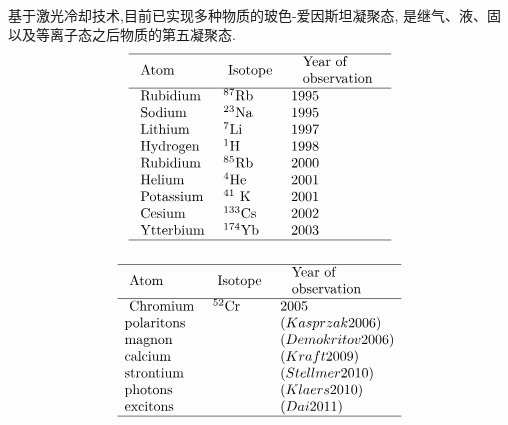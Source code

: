    
    \begin{frame} 
    \frametitle{}
    ~\\
    基于激光冷却技术,目前已实现多种物质的玻色-爱因斯坦凝聚态, 是继气、液、固以及等离子态之后物质的第五凝聚态. 
\[
    \begin{array}{lll}
        \hline \text { Atom } & \text { Isotope } & \begin{array}{l}
        \text { Year of } \\
        \text { observation }
        \end{array} \\
        \hline \text { Rubidium } & { }^{87} \mathrm{Rb} & 1995 \\
        \text { Sodium } & { }^{23} \mathrm{Na} & 1995 \\
        \text { Lithium } & { }^{7} \mathrm{Li} & 1997 \\
        \text { Hydrogen } & { }^{1} \mathrm{H} & 1998 \\
        \text { Rubidium } & { }^{85} \mathrm{Rb} & 2000 \\
        \text { Helium } & { }^{4} \mathrm{He} & 2001 \\
        \text { Potassium } & { }^{41} \mathrm{~K} & 2001 \\
        \text { Cesium } & { }^{133} \mathrm{Cs} & 2002 \\
        \text { Ytterbium } & { }^{174} \mathrm{Yb} & 2003 \\
        \hline
        \end{array}    
\]
    \end{frame}

    \begin{frame} 
    \frametitle{}
    \[
        \begin{array}{lll}
            \hline \text { Atom } & \text { Isotope } & \begin{array}{l}
            \text { Year of } \\
            \text { observation }
            \end{array} \\
            \hline 
            \text { Chromium } & { }^{52} \mathrm{Cr} & 2005 \\
            \text {polaritons} &  & (Kasprzak 2006) \\ 
            \text {magnon} &  & (Demokritov 2006) \\ 
            \text {calcium} & & (Kraft 2009) \\ 
            \text {strontium} & & (Stellmer 2010) \\ 
            \text {photons} & & (Klaers 2010) \\ 
            \text {excitons} & & (Dai 2011) \\
            \hline
            \end{array}  
    \]
    \end{frame}

